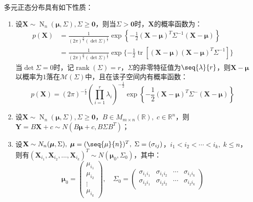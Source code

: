 \begin{property}\label{prop:MultiNormal}
	多元正态分布具有如下性质：
	\begin{enumerate}
		\item 设$\mathbf{X}\sim\operatorname{N}_n(\boldsymbol{\mu},\Sigma),\Sigma\geqslant\mathbf{0}$，则当$\Sigma>\mathbf{0}$时，$\mathbf{X}$的概率函数为：
		\begin{align*}
			p(\mathbf{X})&=\frac{1}{(2\pi)^{\frac{n}{2}}(\det\Sigma)^{\frac{1}{2}}}\exp\left\{-\frac{1}{2}(\mathbf{X}-\boldsymbol{\mu})^T\Sigma^{-1}(\mathbf{X}-\boldsymbol{\mu})\right\} \\
			&=\frac{1}{(2\pi)^{\frac{n}{2}}(\det\Sigma)^{\frac{1}{2}}}\exp\{-\frac{1}{2}\operatorname{tr}[(\mathbf{X}-\boldsymbol{\mu})(\mathbf{X}-\boldsymbol{\mu})^T\Sigma^{-1}]\}
		\end{align*}
		当$\det\Sigma=0$时，记$\operatorname{rank}(\Sigma)=r$，$\Sigma$的非零特征值为$\seq{\lambda}{r}$，则$\mathbf{X}-\boldsymbol{\mu}$以概率为$1$落在$\mathcal{M}(\Sigma)$中，且在该子空间内有概率函数：
		\begin{equation*}
			p(\mathbf{X})=(2\pi)^{-\frac{r}{2}}\left(\prod\limits_{i=1}^r\lambda_i\right)^{-\frac{1}{2}}\exp\left\{-\frac{1}{2}(\mathbf{X}-\boldsymbol{\mu})^T\Sigma^-(\mathbf{X}-\boldsymbol{\mu})\right\}
		\end{equation*}
		\item 设$\mathbf{X}\sim\operatorname{N}_n(\boldsymbol{\mu},\Sigma),\Sigma\geqslant\mathbf{0}$，$B\in M_{m\times n}(\mathbb{R}),\;c\in\mathbb{R}^{n}$，则$\mathbf{Y}=B\mathbf{X}+c\sim N(B\boldsymbol{\mu}+c,B\Sigma B^T)$；
		\item 设$\mathbf{X}\sim N_n(\boldsymbol{\mu},\Sigma),\;\boldsymbol{\mu}=(\seq{\mu}{n})^T,\;\Sigma=(\sigma_{ij})$，$i_1<i_2<\cdots<i_k,\;k\leqslant n$，则有$(\mathbf{X}_{i_1},\mathbf{X}_{i_2},\dots,\mathbf{X}_{i_k})^T\sim N(\boldsymbol{\mu}_0,\Sigma_0)$，其中：
		\begin{equation*}
			\boldsymbol{\mu}_0=
			\begin{pmatrix}
				\mu_{i_1} \\
				\mu_{i_2} \\
				\vdots \\
				\mu_{i_k}
			\end{pmatrix}
			,\quad
			\Sigma_0=
			\begin{pmatrix}
				\sigma_{i_1i_1} & \sigma_{i_1i_2} & \cdots & \sigma_{i_1i_k} \\
				\sigma_{i_2i_1} & \sigma_{i_2i_2} & \cdots & \sigma_{i_2i_k} \\

\end{pmatrix}
\end{equation*}
\end{enumerate}
\end{property}
